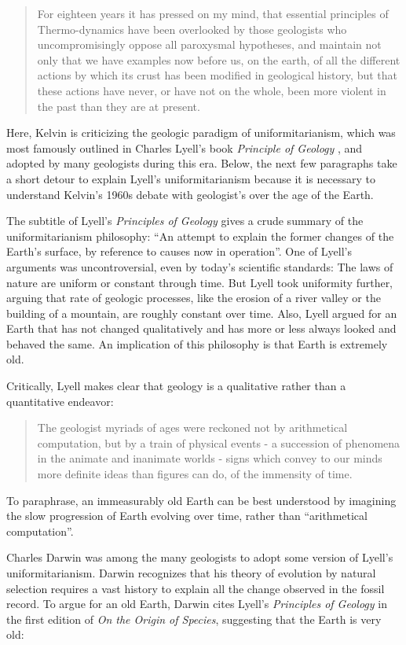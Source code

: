 \documentclass[12pt]{article}
\begin{document}
\begin{quote}
  For eighteen years it has pressed on my mind, that essential principles of Thermo-dynamics have been overlooked by those geologists who uncompromisingly oppose all paroxysmal hypotheses, and maintain not only that we have examples now before us, on the earth, of all the different actions by which its crust has been modified in geological history, but that these actions have never, or have not on the whole, been more violent in the past than they are at present.
\end{quote}
Here, Kelvin is criticizing the geologic paradigm of uniformitarianism, which was most famously outlined in Charles Lyell's book \emph{Principle of Geology} \citep{Lyell_1833}, and adopted by many geologists during this era. Below, the next few paragraphs take a short detour to explain Lyell's uniformitarianism because it is necessary to understand Kelvin's 1960s debate with geologist's over the age of the Earth.

The subtitle of Lyell's \emph{Principles of Geology} gives a crude summary of the uniformitarianism philosophy: ``An attempt to explain the former changes of the Earth's surface, by reference to causes now in operation''. One of Lyell's arguments was uncontroversial, even by today's scientific standards: The laws of nature are uniform or constant through time. But Lyell took uniformity further, arguing that rate of geologic processes, like the erosion of a river valley or the building of a mountain, are roughly constant over time. Also, Lyell argued for an Earth that has not changed qualitatively and has more or less always looked and behaved the same. An implication of this philosophy is that Earth is extremely old.

Critically, Lyell makes clear that geology is a qualitative rather than a quantitative endeavor:

\begin{quote}
  The geologist myriads of ages were reckoned not by arithmetical computation, but by a train of physical events - a succession of phenomena in the animate and inanimate worlds - signs which convey to our minds more definite ideas than figures can do, of the immensity of time. \citep{Lyell_1833}
\end{quote}
To paraphrase, an immeasurably old Earth can be best understood by imagining the slow progression of Earth evolving over time, rather than ``arithmetical computation''.

Charles Darwin was among the many geologists to adopt some version of Lyell's uniformitarianism. Darwin recognizes that his theory of evolution by natural selection requires a vast history to explain all the change observed in the fossil record. To argue for an old Earth, Darwin cites Lyell's \emph{Principles of Geology} in the first edition of \emph{On the Origin of Species}, suggesting that the Earth is very old:
\end{document}
